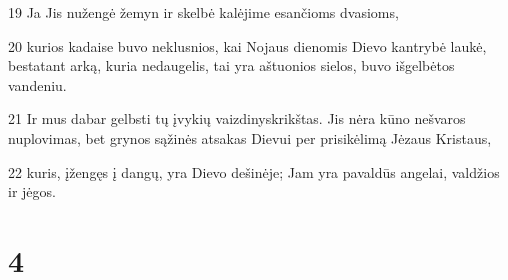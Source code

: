\par 19 Ja Jis nužengė žemyn ir skelbė kalėjime esančioms dvasioms, 
\par 20 kurios kadaise buvo neklusnios, kai Nojaus dienomis Dievo kantrybė laukė, bestatant arką, kuria nedaugelis, tai yra aštuonios sielos, buvo išgelbėtos vandeniu. 
\par 21 Ir mus dabar gelbsti tų įvykių vaizdinys­krikštas. Jis nėra kūno nešvaros nuplovimas, bet grynos sąžinės atsakas Dievui per prisikėlimą Jėzaus Kristaus, 
\par 22 kuris, įžengęs į dangų, yra Dievo dešinėje; Jam yra pavaldūs angelai, valdžios ir jėgos.


\chapter{4}


